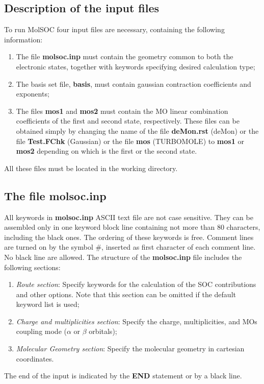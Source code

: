 \documentclass[a4paper,12pt]{article}
\begin{document}
\subsection{Description of the input files}
To run {\sf MolSOC} four input files are necessary, 
containing the following information: 
\begin{enumerate}
\renewcommand{\labelenumi}{(\roman{enumi})}
\item The file {\bf molsoc.inp} must contain the geometry common to both the electronic states, together 
with keywords specifying desired calculation type;
\item The basis set file, {\bf basis}, must contain gaussian contraction
coefficients and exponents;
\item The files {\bf mos1} and {\bf mos2} must contain
the MO linear combination coefficients of the first and second state, respectively. These
files can be obtained simply by changing the name of the file {\bf deMon.rst} ({\sf deMon}) or
the file {\bf Test.FChk} ({\sf Gaussian}) or the file {\bf mos} ({\sf TURBOMOLE})
to {\bf mos1} or {\bf mos2}
depending on which is the first or the second state.
\end{enumerate}
All these files must be located in the working directory.
%
\subsection{The file {\bf molsoc.inp}}
All keywords in {\bf molsoc.inp} ASCII text file are not case sensitive. 
They can be assembled only in one keyword block line containing not more than 80 characters, 
including the black ones. 
The ordering of these keywords
is free. Comment lines are turned on by the symbol $\#$, inserted as first character 
of each comment line. No black line are allowed. 
The structure of the {\bf molsoc.inp} file includes the following 
sections:
\begin{enumerate}
\renewcommand{\labelenumi}{(\roman{enumi})}
\item {\em Route section}: Specify keywords for the calculation of the SOC contributions and 
other options. Note that this section can be omitted if the default keyword list is used;
\item {\em Charge and multiplicities section}: Specify the charge, multiplicities, and MOs  
coupling mode ($\alpha$ or $\beta$ orbitals);
\item {\em Molecular Geometry section}: Specify the molecular geometry in cartesian coordinates.
\end{enumerate}
The end of the input is indicated by the {\bf END} statement or by a black line.
%
\end{document}
